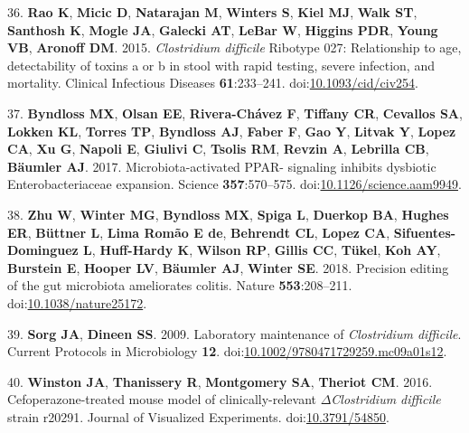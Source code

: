 \documentclass[11pt,]{article}
\newlength{\cslhangindent}
\newenvironment{cslreferences}%
  {\setlength{\parindent}{0pt}%
  \everypar{\setlength{\hangindent}{\cslhangindent}}\ignorespaces}%
  {\par}
\begin{document}
\begin{cslreferences}
\leavevmode\hypertarget{ref-rao2015}{}%
36. \textbf{Rao K}, \textbf{Micic D}, \textbf{Natarajan M},
\textbf{Winters S}, \textbf{Kiel MJ}, \textbf{Walk ST}, \textbf{Santhosh
K}, \textbf{Mogle JA}, \textbf{Galecki AT}, \textbf{LeBar W},
\textbf{Higgins PDR}, \textbf{Young VB}, \textbf{Aronoff DM}. 2015.
\emph{Clostridium difficile} Ribotype 027: Relationship to age,
detectability of toxins a or b in stool with rapid testing, severe
infection, and mortality. Clinical Infectious Diseases
\textbf{61}:233--241.
doi:\href{https://doi.org/10.1093/cid/civ254}{10.1093/cid/civ254}.

\leavevmode\hypertarget{ref-byndloss2017}{}%
37. \textbf{Byndloss MX}, \textbf{Olsan EE}, \textbf{Rivera-Chávez F},
\textbf{Tiffany CR}, \textbf{Cevallos SA}, \textbf{Lokken KL},
\textbf{Torres TP}, \textbf{Byndloss AJ}, \textbf{Faber F}, \textbf{Gao
Y}, \textbf{Litvak Y}, \textbf{Lopez CA}, \textbf{Xu G}, \textbf{Napoli
E}, \textbf{Giulivi C}, \textbf{Tsolis RM}, \textbf{Revzin A},
\textbf{Lebrilla CB}, \textbf{Bäumler AJ}. 2017. Microbiota-activated
PPAR- signaling inhibits dysbiotic Enterobacteriaceae expansion. Science
\textbf{357}:570--575.
doi:\href{https://doi.org/10.1126/science.aam9949}{10.1126/science.aam9949}.

\leavevmode\hypertarget{ref-zhu2018}{}%
38. \textbf{Zhu W}, \textbf{Winter MG}, \textbf{Byndloss MX},
\textbf{Spiga L}, \textbf{Duerkop BA}, \textbf{Hughes ER},
\textbf{Büttner L}, \textbf{Lima Romão E de}, \textbf{Behrendt CL},
\textbf{Lopez CA}, \textbf{Sifuentes-Dominguez L}, \textbf{Huff-Hardy
K}, \textbf{Wilson RP}, \textbf{Gillis CC}, \textbf{Tükel}, \textbf{Koh
AY}, \textbf{Burstein E}, \textbf{Hooper LV}, \textbf{Bäumler AJ},
\textbf{Winter SE}. 2018. Precision editing of the gut microbiota
ameliorates colitis. Nature \textbf{553}:208--211.
doi:\href{https://doi.org/10.1038/nature25172}{10.1038/nature25172}.

\leavevmode\hypertarget{ref-sorg2009}{}%
39. \textbf{Sorg JA}, \textbf{Dineen SS}. 2009. Laboratory maintenance
of \emph{Clostridium difficile}. Current Protocols in Microbiology
\textbf{12}.
doi:\href{https://doi.org/10.1002/9780471729259.mc09a01s12}{10.1002/9780471729259.mc09a01s12}.

\leavevmode\hypertarget{ref-winston2016}{}%
40. \textbf{Winston JA}, \textbf{Thanissery R}, \textbf{Montgomery SA},
\textbf{Theriot CM}. 2016. Cefoperazone-treated mouse model of
clinically-relevant \(\Delta\)\emph{Clostridium difficile} strain
r20291. Journal of Visualized Experiments.
doi:\href{https://doi.org/10.3791/54850}{10.3791/54850}.


\end{cslreferences}
\end{document}
